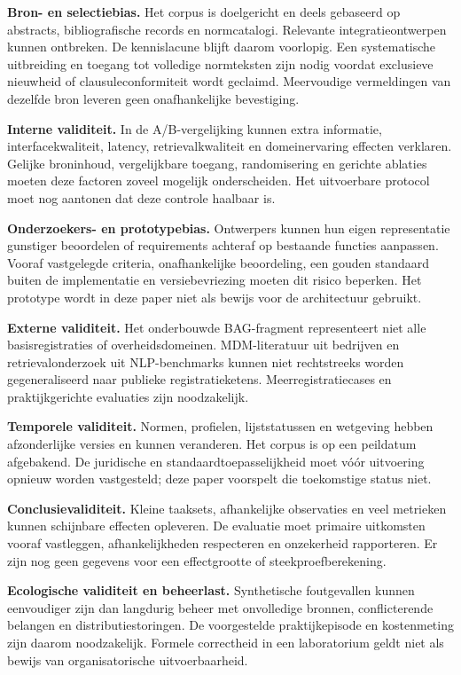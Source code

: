 \textbf{Bron- en selectiebias.} Het corpus is doelgericht en deels gebaseerd op abstracts, bibliografische records en normcatalogi. Relevante integratieontwerpen kunnen ontbreken. De kennislacune blijft daarom voorlopig. Een systematische uitbreiding en toegang tot volledige normteksten zijn nodig voordat exclusieve nieuwheid of clausuleconformiteit wordt geclaimd. Meervoudige vermeldingen van dezelfde bron leveren geen onafhankelijke bevestiging.

\textbf{Interne validiteit.} In de A/B-vergelijking kunnen extra informatie, interfacekwaliteit, latency, retrievalkwaliteit en domeinervaring effecten verklaren. Gelijke broninhoud, vergelijkbare toegang, randomisering en gerichte ablaties moeten deze factoren zoveel mogelijk onderscheiden. Het uitvoerbare protocol moet nog aantonen dat deze controle haalbaar is.

\textbf{Onderzoekers- en prototypebias.} Ontwerpers kunnen hun eigen representatie gunstiger beoordelen of requirements achteraf op bestaande functies aanpassen. Vooraf vastgelegde criteria, onafhankelijke beoordeling, een gouden standaard buiten de implementatie en versiebevriezing moeten dit risico beperken. Het prototype wordt in deze paper niet als bewijs voor de architectuur gebruikt.

\textbf{Externe validiteit.} Het onderbouwde BAG-fragment representeert niet alle basisregistraties of overheidsdomeinen. MDM-literatuur uit bedrijven en retrievalonderzoek uit NLP-benchmarks kunnen niet rechtstreeks worden gegeneraliseerd naar publieke registratieketens. \citep{L05,L17,L16} Meerregistratiecases en praktijkgerichte evaluaties zijn noodzakelijk.

\textbf{Temporele validiteit.} Normen, profielen, lijststatussen en wetgeving hebben afzonderlijke versies en kunnen veranderen. Het corpus is op een peildatum afgebakend. De juridische en standaardtoepasselijkheid moet vóór uitvoering opnieuw worden vastgesteld; deze paper voorspelt die toekomstige status niet.

\textbf{Conclusievaliditeit.} Kleine taaksets, afhankelijke observaties en veel metrieken kunnen schijnbare effecten opleveren. De evaluatie moet primaire uitkomsten vooraf vastleggen, afhankelijkheden respecteren en onzekerheid rapporteren. Er zijn nog geen gegevens voor een effectgrootte of steekproefberekening.

\textbf{Ecologische validiteit en beheerlast.} Synthetische foutgevallen kunnen eenvoudiger zijn dan langdurig beheer met onvolledige bronnen, conflicterende belangen en distributiestoringen. De voorgestelde praktijkepisode en kostenmeting zijn daarom noodzakelijk. Formele correctheid in een laboratorium geldt niet als bewijs van organisatorische uitvoerbaarheid.


